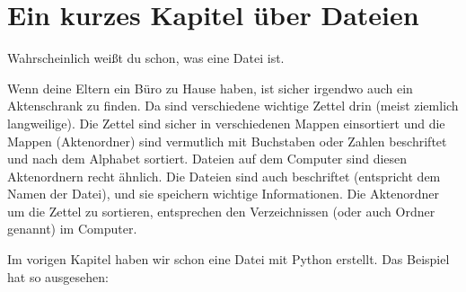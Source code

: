 

\chapter{Ein kurzes Kapitel über Dateien}\label{ch:ashortchapteraboutfiles}

Wahrscheinlich weißt du schon, was eine Datei ist.
\par
\noindent
Wenn deine Eltern ein Büro zu Hause haben, ist sicher irgendwo auch ein Aktenschrank zu finden. Da sind verschiedene wichtige Zettel drin (meist ziemlich langweilige). Die Zettel sind sicher in verschiedenen Mappen einsortiert und die Mappen (Aktenordner) sind vermutlich mit Buchstaben oder Zahlen beschriftet und nach dem Alphabet sortiert. Dateien auf dem Computer sind diesen Aktenordnern recht ähnlich. Die Dateien sind auch beschriftet (entspricht dem Namen der Datei), und sie speichern wichtige Informationen. Die Aktenordner um die Zettel zu sortieren, entsprechen den Verzeichnissen (oder auch Ordner genannt) im Computer.
\par
Im vorigen Kapitel haben wir schon eine Datei mit Python erstellt. Das Beispiel hat so ausgesehen:

